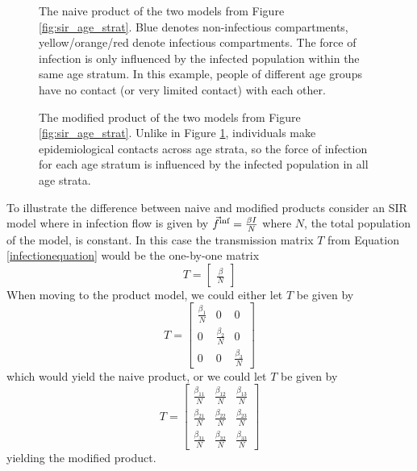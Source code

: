 \begin{figure}
    \centering
    
    \caption{The naive product of the two models from Figure \ref{fig:sir_age_strat}. Blue denotes non-infectious compartments, yellow/orange/red denote infectious compartments. The force of infection is only influenced by the infected population within the same age stratum. In this example, people of different age groups have no contact (or very limited contact) with each other.}
    \label{fig:naive_product}
\end{figure}

\begin{figure}
    \centering
    
    \caption{The modified product of the two models from Figure \ref{fig:sir_age_strat}. Unlike in Figure \ref{fig:naive_product}, individuals make epidemiological contacts across age strata, so the force of infection for each age stratum is influenced by the infected population in all age strata.}
    \label{fig:modified_product}
\end{figure}

\FloatBarrier


To illustrate the difference between naive and modified products consider an SIR model where in infection flow is given by $\vec{f}^\text{inf} = \frac{\beta I}{N}$ where $N$, the total population of the model, is constant. In this case the transmission matrix $T$ from Equation \ref{infectionequation} would be the one-by-one matrix 
\[
    T = \begin{bmatrix} \frac{\beta}{N} \end{bmatrix}
\]
When moving to the product model, we could either let $T$ be given by
\[
    T = \begin{bmatrix}
        \frac{\beta_1}{N} & 0 & 0 \\
        0 & \frac{\beta_2}{N} & 0\\
        0 & 0 & \frac{\beta_3}{N}
    \end{bmatrix}
\]
which would yield the naive product, or we could let $T$ be given by
\[
    T = \begin{bmatrix}
        \frac{\beta_{11}}{N} & \frac{\beta_{12}}{N} & \frac{\beta_{13}}{N} \\
        \frac{\beta_{21}}{N} & \frac{\beta_{22}}{N} & \frac{\beta_{23}}{N}\\
        \frac{\beta_{31}}{N} & \frac{\beta_{32}}{N} & \frac{\beta_{33}}{N}
    \end{bmatrix}
\]
yielding the modified product.

